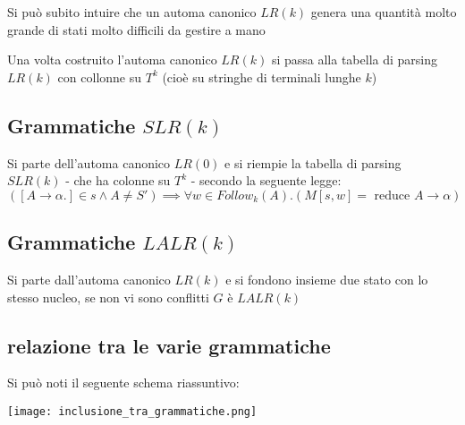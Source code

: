 Si può subito intuire che un automa canonico $LR(k)$ genera una quantità molto grande di stati molto difficili da gestire a mano

Una volta costruito l'automa canonico $LR(k)$ si passa alla tabella di parsing $LR(k)$ con collonne su $T^k$ (cioè su stringhe di terminali lunghe $k$)



\subsection{Grammatiche $SLR(k)$}

Si parte dell'automa canonico $LR(0)$ e si riempie la tabella di parsing $SLR(k)$ - che ha colonne su $T^k$ - secondo la seguente legge: 
\[
    ([A\to\alpha.]\in s\land A\neq S')\implies \forall w\in Follow_k(A).(M[s,w]=\text{ reduce } A\to\alpha)
\] 

\subsection{
    Grammatiche $LALR(k)$
}
Si parte dall'automa canonico $LR(k)$ e si fondono insieme due stato con lo stesso nucleo, se non vi sono conflitti $G$ è $LALR(k)$

\subsection{relazione tra le varie grammatiche}
Si può noti il seguente schema riassuntivo:
\begin{center}
    \texttt{[image: inclusione\_tra\_grammatiche.png]}
\end{center}

